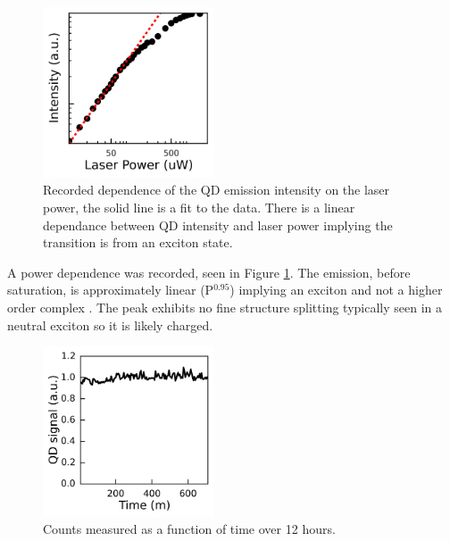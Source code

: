 \begin{figure}[h!] \begin{center}
\includegraphics[width=0.45\textwidth]{images/pdep.png} \caption{Recorded
dependence of the QD emission intensity on the laser power, the solid line is a
fit to the data. There is a linear dependance between QD intensity and laser
power implying the transition is from an exciton state.} \label{fig:pdep}
\end{center} \end{figure}

A power dependence was recorded, seen in Figure \ref{fig:pdep}. The emission,
before saturation, is approximately linear (P$^{0.95}$) implying an exciton and
not a higher order complex \cite{grundmann1997theory}. The peak exhibits no fine
structure splitting typically seen in a neutral exciton
\cite{bayer2002fine,gammon1996fine} so it is likely charged.

\begin{figure}[h!] \begin{center}
\includegraphics[width=0.45\textwidth]{images/stability.png} \caption{Counts
measured as a function of time over 12 hours.} \label{fig:stab} \end{center}
\end{figure}

